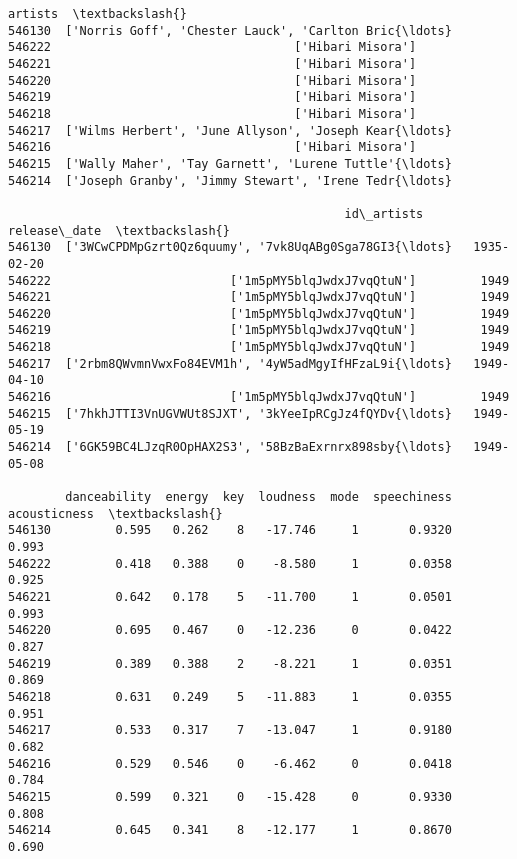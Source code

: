 \documentclass[11pt]{article}
\begin{document}
\begin{tcolorbox}[breakable, size=fbox, boxrule=.5pt, pad at break*=1mm, opacityfill=0]
\begin{Verbatim}[commandchars=\\\{\}]
                                                  artists  \textbackslash{}
546130  ['Norris Goff', 'Chester Lauck', 'Carlton Bric{\ldots}
546222                                  ['Hibari Misora']
546221                                  ['Hibari Misora']
546220                                  ['Hibari Misora']
546219                                  ['Hibari Misora']
546218                                  ['Hibari Misora']
546217  ['Wilms Herbert', 'June Allyson', 'Joseph Kear{\ldots}
546216                                  ['Hibari Misora']
546215  ['Wally Maher', 'Tay Garnett', 'Lurene Tuttle'{\ldots}
546214  ['Joseph Granby', 'Jimmy Stewart', 'Irene Tedr{\ldots}

                                               id\_artists release\_date  \textbackslash{}
546130  ['3WCwCPDMpGzrt0Qz6quumy', '7vk8UqABg0Sga78GI3{\ldots}   1935-02-20
546222                         ['1m5pMY5blqJwdxJ7vqQtuN']         1949
546221                         ['1m5pMY5blqJwdxJ7vqQtuN']         1949
546220                         ['1m5pMY5blqJwdxJ7vqQtuN']         1949
546219                         ['1m5pMY5blqJwdxJ7vqQtuN']         1949
546218                         ['1m5pMY5blqJwdxJ7vqQtuN']         1949
546217  ['2rbm8QWvmnVwxFo84EVM1h', '4yW5adMgyIfHFzaL9i{\ldots}   1949-04-10
546216                         ['1m5pMY5blqJwdxJ7vqQtuN']         1949
546215  ['7hkhJTTI3VnUGVWUt8SJXT', '3kYeeIpRCgJz4fQYDv{\ldots}   1949-05-19
546214  ['6GK59BC4LJzqR0OpHAX2S3', '58BzBaExrnrx898sby{\ldots}   1949-05-08

        danceability  energy  key  loudness  mode  speechiness  acousticness  \textbackslash{}
546130         0.595   0.262    8   -17.746     1       0.9320         0.993
546222         0.418   0.388    0    -8.580     1       0.0358         0.925
546221         0.642   0.178    5   -11.700     1       0.0501         0.993
546220         0.695   0.467    0   -12.236     0       0.0422         0.827
546219         0.389   0.388    2    -8.221     1       0.0351         0.869
546218         0.631   0.249    5   -11.883     1       0.0355         0.951
546217         0.533   0.317    7   -13.047     1       0.9180         0.682
546216         0.529   0.546    0    -6.462     0       0.0418         0.784
546215         0.599   0.321    0   -15.428     0       0.9330         0.808
546214         0.645   0.341    8   -12.177     1       0.8670         0.690


\end{Verbatim}
\end{tcolorbox}
\end{document}
